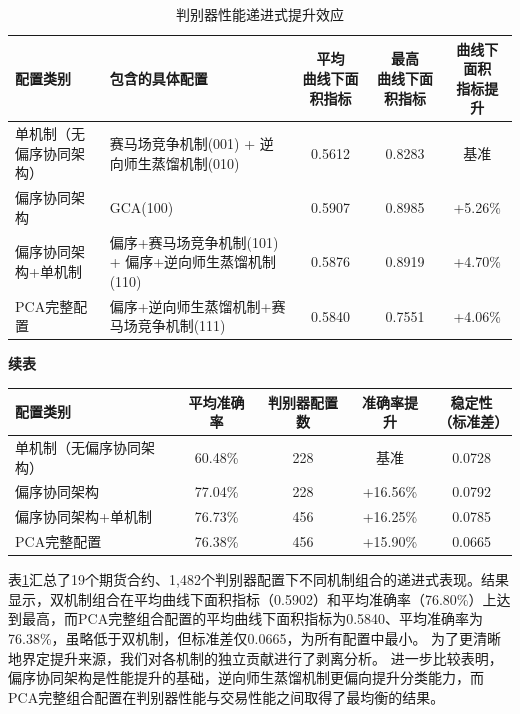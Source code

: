 \begin{table}[H]
\centering
\caption{判别器性能递进式提升效应}
\label{tab:discriminatorprogression}
\footnotesize
\setlength{\tabcolsep}{3pt}
\renewcommand{\arraystretch}{1.18}
\begin{tabular}{p{2.8cm}p{5.0cm}ccc}
\toprule
\textbf{配置类别} & \textbf{包含的具体配置} & \makecell{\textbf{平均}\\\textbf{曲线下面积指标}} & \makecell{\textbf{最高}\\\textbf{曲线下面积指标}} & \makecell{\textbf{曲线下面积}\\\textbf{指标提升}} \\
\midrule
单机制（无偏序协同架构） & 赛马场竞争机制(001) + 逆向师生蒸馏机制(010) & 0.5612 & 0.8283 & 基准 \\
偏序协同架构 & GCA(100) & 0.5907 & 0.8985 & +5.26\% \\
偏序协同架构+单机制 & 偏序+赛马场竞争机制(101) + 偏序+逆向师生蒸馏机制(110) & 0.5876 & 0.8919 & +4.70\% \\
PCA完整配置 & 偏序+逆向师生蒸馏机制+赛马场竞争机制(111) & 0.5840 & 0.7551 & +4.06\% \\
\bottomrule
\end{tabular}
\end{table}
\begin{table}[H]
\centering
{\small\textbf{续表}}\\[0.5em]
\footnotesize
\setlength{\tabcolsep}{6pt}
\renewcommand{\arraystretch}{1.18}
\begin{tabular}{p{4.0cm}cccc}
\toprule
\textbf{配置类别} & \textbf{平均准确率} & \textbf{判别器配置数} & \textbf{准确率提升} & \makecell{\textbf{稳定性}\\\textbf{（标准差）}} \\
\midrule
单机制（无偏序协同架构） & 60.48\% & 228 & 基准 & 0.0728 \\
偏序协同架构 & 77.04\% & 228 & +16.56\% & 0.0792 \\
偏序协同架构+单机制 & 76.73\% & 456 & +16.25\% & 0.0785 \\
PCA完整配置 & 76.38\% & 456 & +15.90\% & 0.0665 \\
\bottomrule
\end{tabular}
\end{table}

表\ref{tab:discriminatorprogression}汇总了19个期货合约、1,482个判别器配置下不同机制组合的递进式表现。结果显示，双机制组合在平均曲线下面积指标（0.5902）和平均准确率（76.80\%）上达到最高，而PCA完整组合配置的平均曲线下面积指标为0.5840、平均准确率为76.38\%，虽略低于双机制，但标准差仅0.0665，为所有配置中最小。
 为了更清晰地界定提升来源，我们对各机制的独立贡献进行了剥离分析。
进一步比较表明，偏序协同架构是性能提升的基础，逆向师生蒸馏机制更偏向提升分类能力，而PCA完整组合配置在判别器性能与交易性能之间取得了最均衡的结果。

